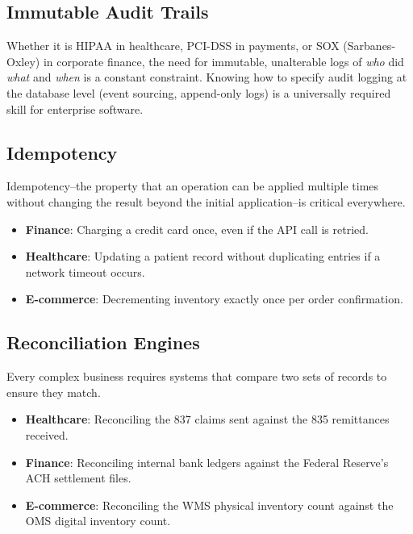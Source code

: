 \documentclass[
  11pt,
  openany,
  oneside]{book}
\providecommand{\tightlist}{%
  \setlength{\itemsep}{0pt}\setlength{\parskip}{0pt}}
\begin{document}
\subsection{Immutable Audit Trails}\label{immutable-audit-trails}

Whether it is HIPAA in healthcare, PCI-DSS in payments, or SOX
(Sarbanes-Oxley) in corporate finance, the need for immutable,
unalterable logs of \emph{who} did \emph{what} and \emph{when} is a
constant constraint. Knowing how to specify audit logging at the
database level (event sourcing, append-only logs) is a universally
required skill for enterprise software.

\subsection{Idempotency}\label{idempotency}

Idempotency--the property that an operation can be applied multiple
times without changing the result beyond the initial application--is
critical everywhere.

\begin{itemize}
\tightlist
\item
  \textbf{Finance}: Charging a credit card once, even if the API call is
  retried.
\item
  \textbf{Healthcare}: Updating a patient record without duplicating
  entries if a network timeout occurs.
\item
  \textbf{E-commerce}: Decrementing inventory exactly once per order
  confirmation.
\end{itemize}

\subsection{Reconciliation Engines}\label{reconciliation-engines}

Every complex business requires systems that compare two sets of records
to ensure they match.

\begin{itemize}
\tightlist
\item
  \textbf{Healthcare}: Reconciling the 837 claims sent against the 835
  remittances received.
\item
  \textbf{Finance}: Reconciling internal bank ledgers against the
  Federal Reserve's ACH settlement files.
\item
  \textbf{E-commerce}: Reconciling the WMS physical inventory count
  against the OMS digital inventory count.
\end{itemize}
\end{document}
